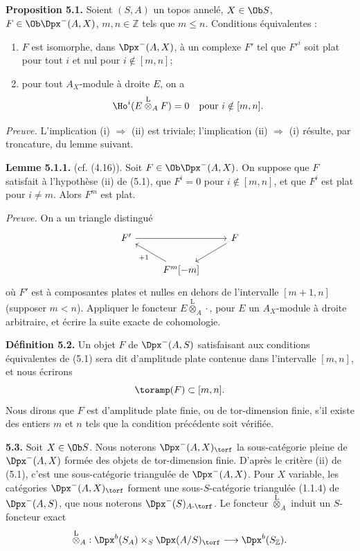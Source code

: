 \documentclass[11pt]{article}
\begin{document}
\textbf{Proposition 5.1.} Soient \((S,A)\) un topos annelé, \(X\in\Ob S\), \(F\in\Ob\Dpx^-(A,X)\), \(m,n\in\mathbb Z\) tels que \(m\leq n\). Conditions équivalentes :
\begin{enumerate}[label=(\roman*)]
\item \(F\) est isomorphe, dans \(\Dpx^-(A,X)\), à un complexe \(F'\) tel que \(F'^i\) soit plat pour tout \(i\) et nul pour \(i\notin[m,n]\);
\item pour tout \(A_X\)-module à droite \(E\), on a
\[
  \Ho^i(E\overset{\mathrm L}{\otimes}_A F)=0\quad\text{pour }i\notin[m,n].
\]
\end{enumerate}

\emph{Preuve.} L'implication (i) \(\Rightarrow\) (ii) est triviale; l'implication (ii) \(\Rightarrow\) (i) résulte, par troncature, du lemme suivant.

\textbf{Lemme 5.1.1.} (cf. (4.16)). Soit \(F\in\Ob\Dpx^-(A,X)\). On suppose que \(F\) satisfait à l'hypothèse (ii) de (5.1), que \(F^i=0\) pour \(i\notin[m,n]\), et que \(F^i\) est plat pour \(i\ne m\). Alors \(F^m\) est plat.

\emph{Preuve.} On a un triangle distingué
\[
\begin{tikzcd}
F' \arrow[rr] && F \arrow[dl]\\
& F^m[-m] \arrow[ul,"+1"] &
\end{tikzcd}
\]
où \(F'\) est à composantes plates et nulles en dehors de l'intervalle \([m+1,n]\) (supposer \(m<n\)). Appliquer le foncteur \(E\overset{\mathrm L}{\otimes}_A\cdot\), pour \(E\) un \(A_X\)-module à droite arbitraire, et écrire la suite exacte de cohomologie.

\textbf{Définition 5.2.} Un objet \(F\) de \(\Dpx^-(A,S)\) satisfaisant aux conditions équivalentes de (5.1) sera dit d'amplitude plate contenue dans l'intervalle \([m,n]\), et nous écrirons
\[
  \toramp(F)\subset[m,n].
\]
Nous dirons que \(F\) est d'amplitude plate finie, ou de tor-dimension finie, s'il existe des entiers \(m\) et \(n\) tels que la condition précédente soit vérifiée.

\textbf{5.3.} Soit \(X\in\Ob S\). Nous noterons \(\Dpx^-(A,X)_{\torf}\) la sous-catégorie pleine de \(\Dpx^-(A,X)\) formée des objets de tor-dimension finie. D'après le critère (ii) de (5.1), c'est une sous-catégorie triangulée de \(\Dpx^-(A,X)\). Pour \(X\) variable, les catégories \(\Dpx^-(A,X)_{\torf}\) forment une sous-\(S\)-catégorie triangulée (1.1.4) de \(\Dpx^-(A,S)\), que nous noterons \(\Dpx^-(S)_{A\text{-}\torf}\). Le foncteur \(\overset{\mathrm L}{\otimes}_A\) induit un \(S\)-foncteur exact
\[
  \overset{\mathrm L}{\otimes}_A:
  \Dpx^b(S_A)\times_S \Dpx(A/S)_{\torf}
  \longrightarrow \Dpx^b(S_{\mathbb Z}).
\]
\end{document}
